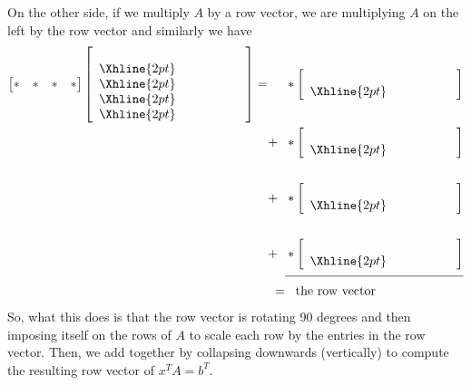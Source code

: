 \documentclass{article}
\begin{document}
On the other side, if we multiply $A$ by a row vector, we are multiplying $A$ on the left by the row vector and similarly we have 
\begin{align*}
	\begin{bmatrix} 
		* & * & * & * 
	\end{bmatrix}
	\begin{bmatrix}
	\begin{array}{c c c c c c}
	& & & & & \\ \Xhline{2pt}
	& & & & & \\ \Xhline{2pt}
	& & & & & \\ \Xhline{2pt}
	& & & & &\\ \Xhline{2pt}
	& & & & &
	\end{array}
	\end{bmatrix}  = \;\;\;\;\;&* \begin{bmatrix}\begin{array}{c c c c c c}
	& & & & & \\ \Xhline{2pt}
	& & & & & \\ 
	\end{array}
	\end{bmatrix} \\
 + \;\;& 
	* \begin{bmatrix}\begin{array}{c c c c c c}
	& & & & & \\ \Xhline{2pt}
	& & & & & \\ 
	\end{array}
	\end{bmatrix} \\\\
 + \;\;& 
	* \begin{bmatrix}\begin{array}{c c c c c c}
	& & & & & \\ \Xhline{2pt}
	& & & & & \\ 
	\end{array}
	\end{bmatrix} \\\\
+\;\; & 
	* \begin{bmatrix}\begin{array}{c c c c c c}
	& & & & & \\ \Xhline{2pt}
	& & & & & \\ 
	\end{array}
	\end{bmatrix}\\
	\cline{2-2} 
	= &\;\;\; \text{the row vector}
\end{align*}
So, what this does is that the row vector is rotating 90 degrees and then imposing itself on the rows of $A$ to scale each row by the entries in the row vector. Then, we add together by collapsing downwards (vertically) to compute the resulting row vector of $x^TA = b^T$.
\end{document}
